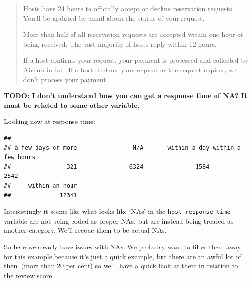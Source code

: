 \documentclass[
]{book}
\newenvironment{Shaded}{\begin{snugshade}}{\end{snugshade}}
\newcommand{\KeywordTok}[1]{\textcolor[rgb]{0.13,0.29,0.53}{\textbf{#1}}}
\newcommand{\NormalTok}[1]{#1}
\newcommand{\OperatorTok}[1]{\textcolor[rgb]{0.81,0.36,0.00}{\textbf{#1}}}
\newcommand{\OtherTok}[1]{\textcolor[rgb]{0.56,0.35,0.01}{#1}}
\newcommand{\StringTok}[1]{\textcolor[rgb]{0.31,0.60,0.02}{#1}}
\begin{document}
\begin{quote}
Hosts have 24 hours to officially accept or decline reservation requests. You'll be updated by email about the status of your request.

More than half of all reservation requests are accepted within one hour of being received. The vast majority of hosts reply within 12 hours.

If a host confirms your request, your payment is processed and collected by Airbnb in full. If a host declines your request or the request expires, we don't process your payment.
\end{quote}

\textbf{TODO: I don't understand how you can get a response time of NA? It must be related to some other variable.}

Looking now at response time:

\begin{Shaded}
\end{Shaded}

\begin{verbatim}
## 
## a few days or more                N/A       within a day within a few hours 
##                321               6324               1584               2542 
##     within an hour 
##              12341
\end{verbatim}

Interestingly it seems like what looks like `NAs' in the \texttt{host\_response\_time} variable are not being coded as proper NAs, but are instead being treated as another category. We'll recode them to be actual NAs.

\begin{Shaded}
\end{Shaded}

So here we clearly have issues with NAs. We probably want to filter them away for this example because it's just a quick example, but there are an awful lot of them (more than 20 per cent) so we'll have a quick look at them in relation to the review score.
\end{document}
